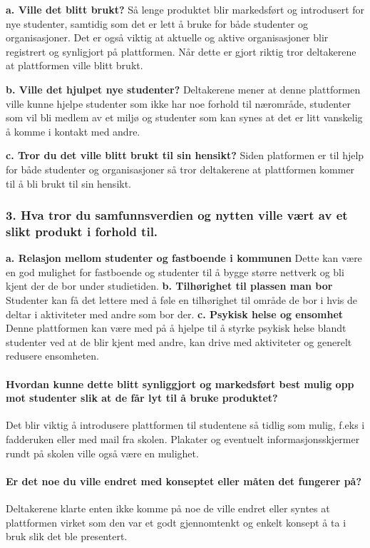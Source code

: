 {\bf a. Ville det blitt brukt?}
Så lenge produktet blir markedsført og introdusert for nye studenter, samtidig som det er lett å bruke for både studenter og organisasjoner. Det er også viktig at aktuelle og aktive organisasjoner blir registrert og synligjort på plattformen. Når dette er gjort riktig tror deltakerene at plattformen ville blitt brukt. 

{\bf b. Ville det hjulpet nye studenter?}
Deltakerene mener at denne plattformen ville kunne hjelpe studenter som ikke har noe forhold til nærområde, studenter som vil bli medlem av et miljø og studenter som kan synes at det er litt vanskelig å komme i kontakt med andre.

{\bf c. Tror du det ville blitt brukt til sin hensikt?}
Siden platformen er til hjelp for både studenter og organisasjoner så tror deltakerene at plattformen kommer til å bli brukt til sin hensikt.

\subsubsection{3. Hva tror du samfunnsverdien og nytten ville vært av et slikt produkt i forhold til.}

{\bf a. Relasjon mellom studenter og fastboende i kommunen}
Dette kan være en god mulighet for fastboende og studenter til å bygge større nettverk og bli kjent der de bor under studietiden.
{\bf b. Tilhørighet til plassen man bor}
Studenter kan få det lettere med å føle en tilhørighet til område de bor i hvis de deltar i aktiviteter med andre som bor der.
{\bf c. Psykisk helse og ensomhet}
Denne plattformen kan være med på å hjelpe til å styrke psykisk helse blandt studenter ved at de blir kjent med andre, kan drive med aktiviteter og generelt redusere ensomheten.
\paragraph{Hvordan kunne dette blitt synliggjort og markedsført best mulig opp mot studenter slik at de får lyt til å bruke produktet?} Det blir viktig å introdusere plattformen til studentene så tidlig som mulig, f.eks i fadderuken eller med mail fra skolen. Plakater og eventuelt informasjonsskjermer rundt på skolen ville også være en mulighet.

\paragraph{Er det noe du ville endret med konseptet eller måten det fungerer på?} Deltakerene klarte enten ikke komme på noe de ville endret eller syntes at plattformen virket som den var et godt gjennomtenkt og enkelt konsept å ta i bruk slik det ble presentert.

